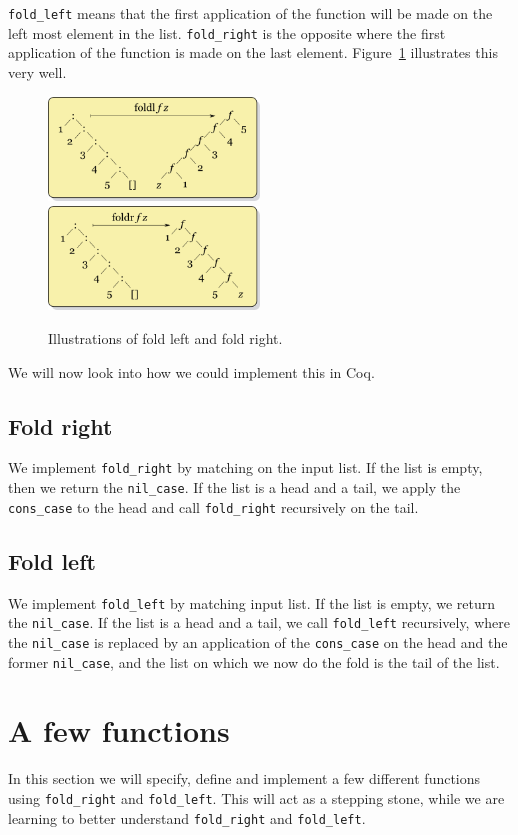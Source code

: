 \documentclass[a4paper]{article}
\begin{document}
\texttt{fold\_left} means that the first application of the function will be
made on the left most element in the list. \texttt{fold\_right} is the opposite
where the first application of the function is made on the last element.
Figure~\ref{fig:folds} illustrates this very well.

\begin{figure}[h]
\includegraphics[width=0.5\textwidth]{fold_left}
\includegraphics[width=0.5\textwidth]{fold_right}
\caption{Illustrations of fold left and fold right.~\cite{foldl}\cite{foldr}}
\label{fig:folds}
\end{figure}

We will now look into how we could implement this in Coq.

\subsection{Fold right} 
We implement \texttt{fold\_right} by matching on the input list. If the list is
empty, then we return the \texttt{nil\_case}. If the list is a head and a tail,
we apply the \texttt{cons\_case} to the head and call \texttt{fold\_right}
recursively on the tail.

\subsection{Fold left}
We implement \texttt{fold\_left} by matching input list. If the list is empty,
we return the \texttt{nil\_case}. If the list is a head and a tail, we call
\texttt{fold\_left} recursively, where the \texttt{nil\_case} is replaced by
an application of the \texttt{cons\_case} on the head and the former
\texttt{nil\_case}, and the list on which we now do the fold is the tail of the
list.

\section{A few functions}
In this section we will specify, define and implement a few different functions
using \texttt{fold\_right} and \texttt{fold\_left}. This will act as a stepping
stone, while we are learning to better understand \texttt{fold\_right} and
\texttt{fold\_left}.
\end{document}
